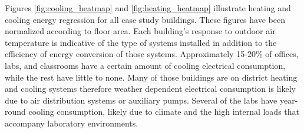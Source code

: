 Figures \ref{fig:cooling_heatmap} and \ref{fig:heating_heatmap} illustrate heating and cooling energy regression for all case study buildings. These figures have been normalized according to floor area. Each building's response to outdoor air temperature is indicative of the type of systems installed in addition to the efficiency of energy conversion of those systems. Approximately 15-20\% of offices, labs, and classrooms have a certain amount of cooling electrical consumption, while the rest have little to none. Many of those buildings are on district heating and cooling systems therefore weather dependent electrical consumption is likely due to air distribution systems or auxiliary pumps. Several of the labs have year-round cooling consumption, likely due to climate and the high internal loads that accompany laboratory environments.